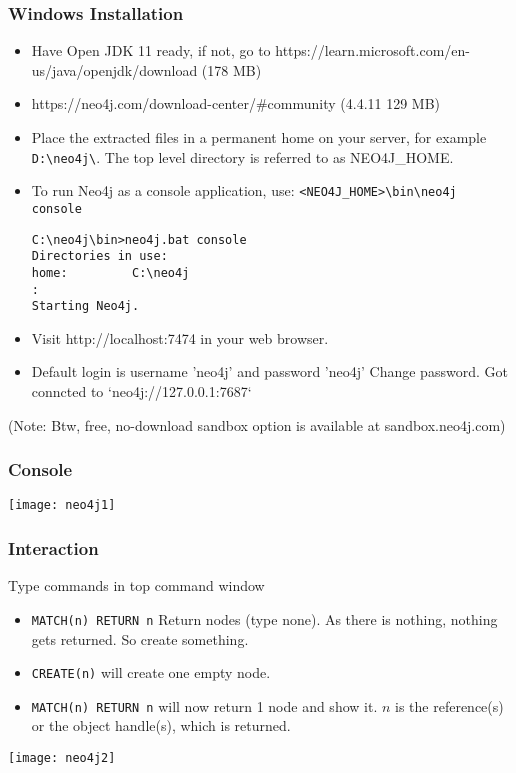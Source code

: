 \begin{frame}[fragile]\frametitle{Windows Installation}

\begin{itemize}
\item Have Open JDK 11 ready, if not, go to https://learn.microsoft.com/en-us/java/openjdk/download (178 MB)
\item https://neo4j.com/download-center/\#community (4.4.11 129 MB)
\item Place the extracted files in a permanent home on your server, for example \lstinline|D:\neo4j\|. The top level directory is referred to as NEO4J\_HOME.
\item To run Neo4j as a console application, use: \lstinline|<NEO4J_HOME>\bin\neo4j console|

\begin{lstlisting}
C:\neo4j\bin>neo4j.bat console
Directories in use:
home:         C:\neo4j
:
Starting Neo4j.
\end{lstlisting}

\item Visit http://localhost:7474 in your web browser.
\item Default login is username 'neo4j' and password 'neo4j' Change password. Got conncted to `neo4j://127.0.0.1:7687`
\end{itemize}

(Note: Btw, free, no-download sandbox option is available at sandbox.neo4j.com)
\end{frame}


\begin{frame}[fragile]\frametitle{Console}

\begin{center}
\texttt{[image: neo4j1]}
\end{center}	  


\end{frame}

\begin{frame}[fragile]\frametitle{Interaction}

Type commands in top command window

\begin{itemize}
\item \lstinline|MATCH(n) RETURN n| Return nodes (type none). As there is nothing, nothing gets returned. So create something.
\item \lstinline|CREATE(n)| will create one empty node.
\item \lstinline|MATCH(n) RETURN n| will now return 1 node and show it. $n$ is the reference(s) or the object handle(s), which is returned.
\end{itemize}

\begin{center}
\texttt{[image: neo4j2]}
\end{center}

\end{frame}


